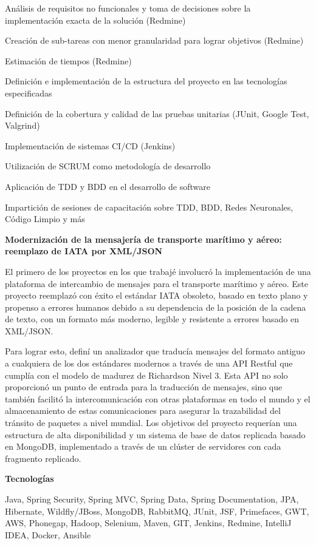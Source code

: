 \documentclass[a4paper,10pt]{article}
\newcommand{\cvsubsubsection}[1]{
\begin{tcolorbox}[colback=gray!10, colframe=gray!10, boxrule=0pt, arc=0mm, outer arc=0mm, width=\textwidth, boxsep=0pt, left=4mm, right=4mm, top=1mm, bottom=1mm]
  \textbf{#1}
\end{tcolorbox}
\vspace{1mm}
}
\newcommand{\cvsubsubsubsection}[1]{
  \begin{tcolorbox}[colback=gray!5, colframe=gray!5, boxrule=0pt, arc=0mm, outer arc=0mm, width=\textwidth, boxsep=0pt, left=6mm, right=6mm, top=1mm, bottom=1mm]
    \textbf{#1}
  \end{tcolorbox}
  \vspace{1mm}
}
\begin{document}
Análisis de requisitos no funcionales y toma de decisiones sobre la implementación exacta de la solución (Redmine)

Creación de sub-tareas con menor granularidad para lograr objetivos (Redmine)

Estimación de tiempos (Redmine)

Definición e implementación de la estructura del proyecto en las tecnologías especificadas

Definición de la cobertura y calidad de las pruebas unitarias (JUnit, Google Test, Valgrind)

Implementación de sistemas CI/CD (Jenkins)

Utilización de SCRUM como metodología de desarrollo

Aplicación de TDD y BDD en el desarrollo de software

Impartición de sesiones de capacitación sobre TDD, BDD, Redes Neuronales, Código Limpio y más



\cvsubsubsection{Modernización de la mensajería de transporte marítimo y aéreo: reemplazo de IATA por XML/JSON}
El primero de los proyectos en los que trabajé involucró la implementación de una plataforma de intercambio de mensajes para el transporte marítimo y aéreo. Este proyecto reemplazó con éxito el estándar IATA obsoleto, basado en texto plano y propenso a errores humanos debido a su dependencia de la posición de la cadena de texto, con un formato más moderno, legible y resistente a errores basado en XML/JSON.

Para lograr esto, definí un analizador que traducía mensajes del formato antiguo a cualquiera de los dos estándares modernos a través de una API Restful que cumplía con el modelo de madurez de Richardson Nivel 3. Esta API no solo proporcionó un punto de entrada para la traducción de mensajes, sino que también facilitó la intercomunicación con otras plataformas en todo el mundo y el almacenamiento de estas comunicaciones para asegurar la trazabilidad del tránsito de paquetes a nivel mundial. Los objetivos del proyecto requerían una estructura de alta disponibilidad y un sistema de base de datos replicada basado en MongoDB, implementado a través de un clúster de servidores con cada fragmento replicado.

\cvsubsubsubsection{Tecnologías}
Java, Spring Security, Spring MVC, Spring Data, Spring Documentation, JPA, Hibernate, Wildfly/JBoss, MongoDB, RabbitMQ, JUnit, JSF, Primefaces, GWT, AWS, Phonegap, Hadoop, Selenium, Maven, GIT, Jenkins, Redmine, IntelliJ IDEA, Docker, Ansible
\end{document}
